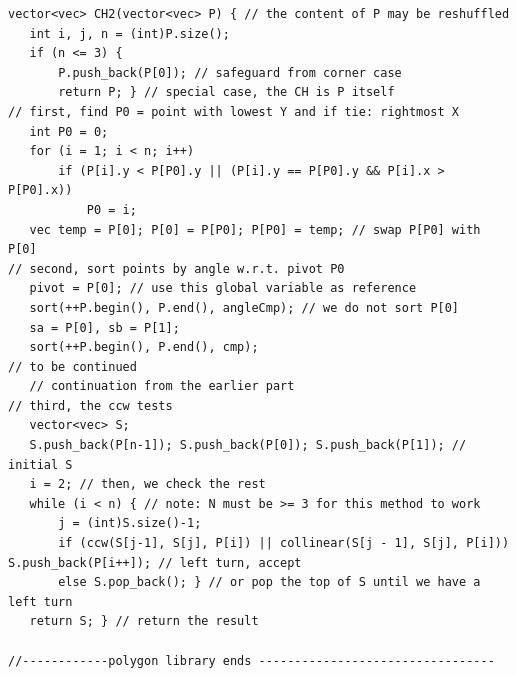 \documentclass[8pt, a4paper, oneside, twocolumn]{extarticle}
\begin{document}
\begin{verbatim}
vector<vec> CH2(vector<vec> P) { // the content of P may be reshuffled
   int i, j, n = (int)P.size();
   if (n <= 3) {
       P.push_back(P[0]); // safeguard from corner case
       return P; } // special case, the CH is P itself
// first, find P0 = point with lowest Y and if tie: rightmost X
   int P0 = 0;
   for (i = 1; i < n; i++)
       if (P[i].y < P[P0].y || (P[i].y == P[P0].y && P[i].x > P[P0].x))
           P0 = i;
   vec temp = P[0]; P[0] = P[P0]; P[P0] = temp; // swap P[P0] with P[0]
// second, sort points by angle w.r.t. pivot P0
   pivot = P[0]; // use this global variable as reference
   sort(++P.begin(), P.end(), angleCmp); // we do not sort P[0]
   sa = P[0], sb = P[1];
   sort(++P.begin(), P.end(), cmp);
// to be continued
   // continuation from the earlier part
// third, the ccw tests
   vector<vec> S;
   S.push_back(P[n-1]); S.push_back(P[0]); S.push_back(P[1]); // initial S
   i = 2; // then, we check the rest
   while (i < n) { // note: N must be >= 3 for this method to work
       j = (int)S.size()-1;
       if (ccw(S[j-1], S[j], P[i]) || collinear(S[j - 1], S[j], P[i])) S.push_back(P[i++]); // left turn, accept
       else S.pop_back(); } // or pop the top of S until we have a left turn
   return S; } // return the result

//------------polygon library ends ---------------------------------
\end{verbatim}
\end{document}
